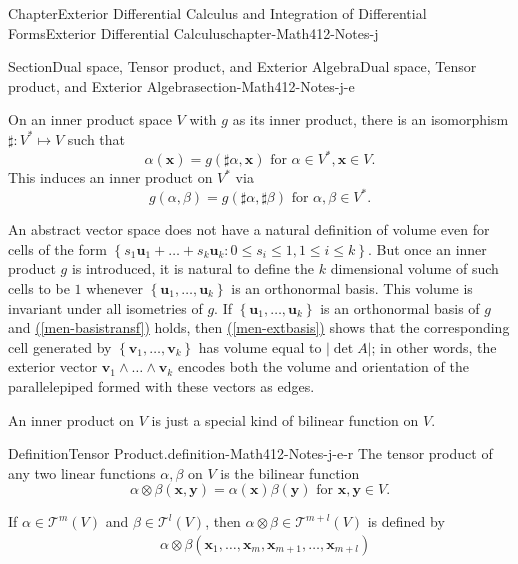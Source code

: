 \documentclass[oneside,10pt,]{book}
\newcommand{\xreffont}{\relax}
\numberwithin{equation}{section}
\newcommand{\bx}{\mathbf{x}}
\newcommand{\amp}{&}
\begin{document}
\begin{chapterptx}{Chapter}{Exterior Differential Calculus and Integration of Differential Forms}{}{Exterior Differential Calculus}{}{}{chapter-Math412-Notes-j}
\begin{sectionptx}{Section}{Dual space, Tensor product, and Exterior Algebra}{}{Dual space, Tensor product, and Exterior Algebra}{}{}{section-Math412-Notes-j-e}
\par
On an inner product space \(V\) with \(g\) as its inner product, there is an isomorphism \(\sharp: V^{*}\mapsto V\) such that%
\begin{equation*}
\alpha(\mathbf x)=g(\sharp \alpha, \mathbf x) \text{ for } \alpha \in V^{*}, \mathbf x\in V.
\end{equation*}
This induces an inner product on \(V^{*}\) via%
\begin{equation*}
g(\alpha, \beta)=g(\sharp \alpha, \sharp \beta) \text{ for } \alpha, \beta \in V^{*}.
\end{equation*}
%
\par
An abstract vector space does not have a natural definition of volume even for cells of the form \(\left\{s_{1}{\mathbf u}_{1}+ \ldots+ s_{k} {\mathbf u}_{k}: 0\le s_{i}\le 1,
1\le i \le k\right\}\). But once an inner product \(g\) is introduced, it is natural to define the \(k\) dimensional volume of such cells to be \(1\) whenever \(\left\{ {\mathbf u}_{1}, \ldots, {\mathbf u}_{k}\right\}\) is an orthonormal basis. This volume is invariant under all isometries of \(g\). If \(\left\{ {\mathbf u}_{1}, \ldots, {\mathbf u}_{k}\right\}\) is an orthonormal basis of \(g\) and \hyperref[men-basistransf]{({\xreffont\ref{men-basistransf}})} holds, then \hyperref[men-extbasis]{({\xreffont\ref{men-extbasis}})} shows that the corresponding cell generated by \(\left\{ {\mathbf v}_{1}, \ldots, {\mathbf v}_{k}\right\}\) has volume equal to \(|\det A|\); in other words, the exterior vector \({\mathbf v}_{1}\wedge \ldots\wedge {\mathbf v}_{k}\) encodes both the volume and orientation of the parallelepiped formed with these vectors as edges.%
\par
An inner product on \(V\) is just a special kind of bilinear function on \(V\).%
\begin{definition}{Definition}{Tensor Product.}{definition-Math412-Notes-j-e-r}%
The tensor product of any two linear functions \(\alpha, \beta\) on \(V\) is the bilinear function%
\begin{equation*}
\alpha \otimes \beta ({\mathbf x}, {\mathbf y})= \alpha ({\mathbf x}) \beta ({\mathbf y}) 
\text{ for } {\mathbf x}, {\mathbf y} \in V.
\end{equation*}
%
\par
If \(\alpha\in {\mathcal T}^{m}(V)\) and \(\beta \in {\mathcal T}^{l}(V)\), then \(\alpha \otimes \beta \in  {\mathcal T}^{m+l}(V)\) is defined by%
\begin{align*}
\amp \alpha \otimes \beta (\bx_{1}, \ldots, \bx_{m},\bx_{m+1},\ldots, \bx_{m+l})\\

\end{align*}
\end{definition}
\end{sectionptx}
\end{chapterptx}
\end{document}
